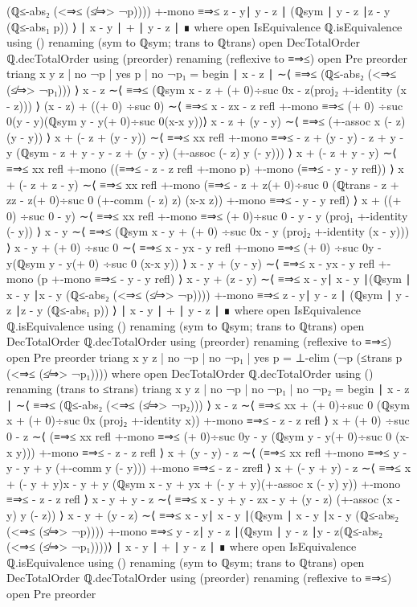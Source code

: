\documentclass[11pt,a4paper]{article}
\begin{document}
\begin{code}
  (ℚ≤-abs₂ (<⇒≤ (≰⇒> ¬p)))) +-mono ≡⇒≤ {z - y}{∣ y - z ∣}
  (ℚsym {∣ y - z ∣}{z - y} (ℚ≤-abs₁ p)) ⟩
  ∣ x - y ∣ + ∣ y - z ∣ ∎ 
     where
     open IsEquivalence ℚ.isEquivalence using ()
       renaming (sym to ℚsym; trans to ℚtrans)
     open DecTotalOrder ℚ.decTotalOrder using (preorder)
       renaming (reflexive to ≡⇒≤)
     open Pre preorder
triang x y z | no ¬p | yes p | no ¬p₁ = begin
  ∣ x - z ∣   ∼⟨ ≡⇒≤ (ℚ≤-abs₂ (<⇒≤ (≰⇒> ¬p₁)))   ⟩
  x - z ∼⟨ ≡⇒≤ (ℚsym {x - z + (+ 0)÷suc 0}{x - z}(proj₂ +-identity (x - z))) ⟩
  (x - z) + ((+ 0) ÷suc 0) ∼⟨  ≡⇒≤ {x - z}{x - z} refl
  +-mono ≡⇒≤ {(+ 0) ÷suc 0}{(y - y)}(ℚsym {y - y}{(+ 0)÷suc 0}(x-x {y}))⟩
  x - z + (y - y) ∼⟨ ≡⇒≤ (+-assoc x (- z) (y - y)) ⟩
  x + (- z + (y - y)) ∼⟨ ≡⇒≤ {x}{x} refl +-mono
  ≡⇒≤ { - z + (y - y)}{ - z + y - y}
  (ℚsym { - z + y - y}{ - z + (y - y)} (+-assoc (- z) y (- y))) ⟩
  x + (- z + y - y) ∼⟨ ≡⇒≤ {x}{x} refl +-mono ((≡⇒≤ { - z}{ - z} refl
  +-mono p)  +-mono (≡⇒≤ { - y}{ - y} refl)) ⟩
  x + (- z + z - y) ∼⟨ ≡⇒≤ {x}{x} refl +-mono
  (≡⇒≤ { - z + z}{(+ 0)÷suc 0} (ℚtrans { - z + z}{z - z}{(+ 0)÷suc 0}
  (+-comm (- z) z) (x-x {z})) +-mono ≡⇒≤ { - y}{ - y} refl) ⟩
  x + ((+ 0) ÷suc 0 - y) ∼⟨ ≡⇒≤ {x}{x} refl +-mono
  ≡⇒≤ {(+ 0)÷suc 0 - y}{ - y} (proj₁ +-identity (- y)) ⟩
  x - y ∼⟨ ≡⇒≤ (ℚsym {x - y + (+ 0) ÷suc 0}{x - y} (proj₂ +-identity (x - y))) ⟩
  x - y + (+ 0) ÷suc 0 ∼⟨ ≡⇒≤ {x - y}{x - y} refl +-mono
  ≡⇒≤ {(+ 0) ÷suc 0}{y - y}(ℚsym {y - y}{(+ 0) ÷suc 0} (x-x {y})) ⟩
  x - y + (y - y) ∼⟨ ≡⇒≤ {x - y}{x - y} refl +-mono
  (p +-mono ≡⇒≤ { - y}{ - y} refl) ⟩
  x - y + (z - y) ∼⟨ ≡⇒≤ {x - y}{∣ x - y ∣}(ℚsym {∣ x - y ∣}{x - y}
  (ℚ≤-abs₂ (<⇒≤ (≰⇒> ¬p)))) +-mono ≡⇒≤ {z - y}{∣ y - z ∣}
  (ℚsym {∣ y - z ∣}{z - y} (ℚ≤-abs₁ p)) ⟩
  ∣ x - y ∣ + ∣ y - z ∣ ∎
     where
     open IsEquivalence ℚ.isEquivalence using ()
       renaming (sym to ℚsym; trans to ℚtrans)
     open DecTotalOrder ℚ.decTotalOrder using (preorder)
       renaming (reflexive to ≡⇒≤)
     open Pre preorder
triang x y z | no ¬p | no ¬p₁ | yes p =
  ⊥-elim (¬p (≤trans p (<⇒≤ (≰⇒> ¬p₁))))
  where
  open DecTotalOrder ℚ.decTotalOrder using ()
      renaming (trans to ≤trans)
triang x y z | no ¬p | no ¬p₁ | no ¬p₂ = begin 
  ∣ x - z ∣             ∼⟨ ≡⇒≤ (ℚ≤-abs₂ (<⇒≤ (≰⇒> ¬p₂)))   ⟩
  x - z                ∼⟨ ≡⇒≤ {x}{x + (+ 0)÷suc 0}
  (ℚsym {x + (+ 0)÷suc 0}{x} (proj₂ +-identity x)) +-mono ≡⇒≤ { - z}{ - z} refl ⟩
  x + (+ 0) ÷suc 0 - z ∼⟨ (≡⇒≤ {x}{x} refl  +-mono
  ≡⇒≤ {(+ 0)÷suc 0}{y - y} (ℚsym {y - y}{(+ 0)÷suc 0} (x-x {y}))) +-mono
  ≡⇒≤ { - z}{ - z} refl ⟩
  x + (y - y) - z      ∼⟨ (≡⇒≤ {x}{x} refl  +-mono
  ≡⇒≤ {y - y}{ - y + y} (+-comm y (- y))) +-mono ≡⇒≤ { - z}{ - z}refl ⟩
  x + (- y + y) - z    ∼⟨ ≡⇒≤ {x + (- y + y)}{x - y + y}
  (ℚsym {x - y + y}{x + (- y + y)}(+-assoc x (- y) y)) +-mono
    ≡⇒≤ { - z}{ - z} refl ⟩
  x - y + y - z        ∼⟨ ≡⇒≤ { x - y + y - z}{x - y + (y - z)}
    (+-assoc (x - y) y (- z)) ⟩
  x - y + (y - z)      ∼⟨ ≡⇒≤ {x - y}{∣ x - y ∣}(ℚsym {∣ x - y ∣}{x - y}
    (ℚ≤-abs₂ (<⇒≤ (≰⇒> ¬p)))) +-mono
    ≡⇒≤ {y - z}{∣ y - z ∣}(ℚsym {∣ y - z ∣}{y - z}(ℚ≤-abs₂ (<⇒≤ (≰⇒> ¬p₁))))⟩  
  ∣ x - y ∣ + ∣ y - z ∣ ∎
     where
     open IsEquivalence ℚ.isEquivalence using ()
       renaming (sym to ℚsym; trans to ℚtrans)
     open DecTotalOrder ℚ.decTotalOrder using (preorder)
       renaming (reflexive to ≡⇒≤)
     open Pre preorder
\end{code}
\end{document}
